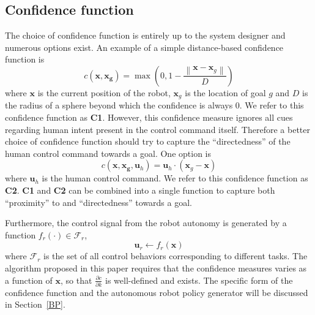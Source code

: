 \documentclass[conference]{IEEEtran}
\newcommand{\norm}[1]{\left\lVert#1\right\rVert}
\begin{document}
\subsection{Confidence function}\label{CF}
The choice of confidence function is entirely up to the system designer and numerous options exist. An example of a simple distance-based confidence function is
\begin{equation*}\label{EQ1}
c(\boldsymbol{x}, \boldsymbol{x_g}) = \max(0, 1 - \frac{\norm{\boldsymbol{x} - \boldsymbol{x}_{g}}}{D})
\end{equation*}
where $\boldsymbol{x}$ is the current position of the robot, $\boldsymbol{x}_{g}$ is the location of goal $g$ and $D$ is the radius of a sphere beyond which the confidence is always $0$. We refer to this confidence function as \textbf{C1}. However, this confidence measure ignores all cues regarding human intent present in the control command itself. Therefore a better choice of confidence function should try to capture the ``directedness'' of the human control command towards a goal. One option is
\begin{equation*}\label{EQ2}
c({\boldsymbol{x},\boldsymbol{x_g}, \boldsymbol{u}_{h}}) = \boldsymbol{u}_h\cdot(\boldsymbol{x}_{g} - \boldsymbol{x})
\end{equation*}
where $\boldsymbol{u}_h$ is the human control command. We refer to this confidence function as \textbf{C2}. \textbf{C1} and \textbf{C2} can be combined into a single function to capture both ``proximity'' to and ``directedness'' towards a goal.

Furthermore, the control signal from the robot autonomy is generated by a function $f_{r}(\cdot) \in \mathcal{F}_{r}$, 
\begin{equation}
\boldsymbol{u}_r \leftarrow f_{r}(\boldsymbol{x})
\end{equation}
where $\mathcal{F}_{r}$ is the set of all control behaviors corresponding to different tasks. The algorithm proposed in this paper requires that the confidence measures varies as a function of $\boldsymbol{x}$, so that $\frac{\partial c}{\partial k}$ is well-defined and exists. The specific form of the confidence function and the autonomous robot policy generator will be discussed in Section~\ref{BP}.
\end{document}
